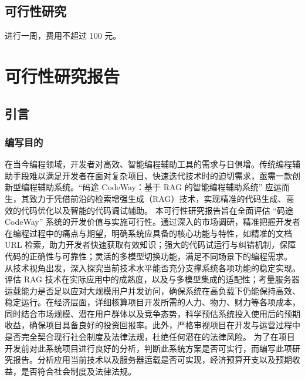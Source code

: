 \documentclass[
    report,     %
    oneside,    %
    UTF8,       %
    zihao=-4    %
]{config} %
\begin{document}
\section{可行性研究}
进行一周，费用不超过 100 元。


\chapter{可行性研究报告}
\section{引言}
\subsection{编写目的}
在当今编程领域，开发者对高效、智能编程辅助工具的需求与日俱增。传统编程辅助手段难以满足开发者在面对复杂项目、快速迭代技术时的迫切需求，亟需一款创新型编程辅助系统。“码途 CodeWay：基于 RAG 的智能编程辅助系统” 应运而生，其致力于凭借前沿的检索增强生成（RAG）技术，实现精准的代码生成、高效的代码优化以及智能的代码调试辅助。
本可行性研究报告旨在全面评估 “码途 CodeWay” 系统的开发价值与实施可行性。通过深入的市场调研，精准把握开发者在编程过程中的痛点与期望，明确系统应具备的核心功能与特性，如精准的文档 URL 检索，助力开发者快速获取有效知识；强大的代码试运行与纠错机制，保障代码的正确性与可靠性；灵活的多模型切换功能，满足不同场景下的编程需求。
从技术视角出发，深入探究当前技术水平能否充分支撑系统各项功能的稳定实现。评估 RAG 技术在实际应用中的成熟度，以及与多模型集成的适配性；考量服务器运载能力是否足以应对大规模用户并发访问，确保系统在高负载下仍能保持高效、稳定运行。在经济层面，详细核算项目开发所需的人力、物力、财力等各项成本，同时结合市场规模、潜在用户群体以及竞争态势，科学预估系统投入使用后的预期收益，确保项目具备良好的投资回报率。此外，严格审视项目在开发与运营过程中是否完全契合现行社会制度及法律法规，杜绝任何潜在的法律风险。
为了在项目开发前对此系统项目进行良好的分析，判断此系统方案是否可实行，而编写此项研究报告。分析应用当前技术以及服务器运载是否可实现，经济预算开支以及预期收益，是否符合社会制度及法律法规。
\end{document}
